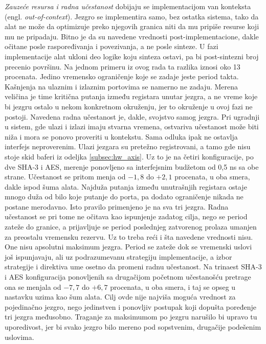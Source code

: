 \textit{Zauzeće resursa i radna učestanost} dobijaju se implementacijom van konteksta (engl. \textit{out-of-context}). Jezgro se implementira samo, bez ostatka sistema, tako da alat ne može da optimizuje preko njegovih granica niti da mu pripiše resurse koji mu ne pripadaju. Bitno je da su navedene vrednosti post-implementacione, dakle očitane posle raspoređivanja i povezivanja, a ne posle sinteze. U fazi implementacije alat ukloni deo logike koju sinteza ostavi, pa bi post-sintezni broj precenio površinu. Na jednom primeru iz ovog rada ta razlika iznosi oko 13 procenata.
\smallbreak
Jedino vremensko ograničenje koje se zadaje jeste period takta. Kašnjenja na ulaznim i izlaznim portovima se namerno ne zadaju. Merena veličina je time kritična putanja između registara unutar jezgra, a ne vreme koje bi jezgru ostalo u nekom konkretnom okruženju, jer to okruženje u ovoj fazi ne postoji. Navedena radna učestanost je, dakle, svojstvo samog jezgra. Pri ugradnji u sistem, gde ulazi i izlazi imaju stvarna vremena, ostvariva učestanost može biti niža i mora se ponovo proveriti u kontekstu. Sama odluka ipak ne ostavlja interfejs neproverenim. Ulazi jezgara su pretežno registrovani, a tamo gde nisu stoje skid baferi iz odeljka \ref{subsec:hw_axis}. Uz to je na četiri konfiguracije, po dve SHA-3 i AES, merenje ponovljeno sa interfejsnim budžetom od 0,5 ns sa obe strane. Učestanost se pritom menja od $-1{,}8$ do $+2{,}1$ procenata, u oba smera, dakle ispod šuma alata. Najduža putanja između unutrašnjih registara ostaje mnogo duža od bilo koje putanje do porta, pa dodato ograničenje nikada ne postane merodavno. Isto pravilo primenjeno je na sva tri jezgra. Radna učestanost se pri tome ne očitava kao ispunjenje zadatog cilja, nego se period zateže do granice, a prijavljuje se period poslednjeg zatvorenog prolaza umanjen za preostalu vremensku rezervu.
\smallbreak
Uz to treba reći i šta navedene vrednosti nisu. One nisu apsolutni maksimum jezgra. Period se zateže dok se vremenski uslovi još ispunjavaju, ali uz podrazumevanu strategiju implementacije, a izbor strategije i direktiva ume osetno da promeni radnu učestanost. Na trinaest SHA-3 i AES konfiguracija ponovljenih sa drugačijom početnom učestanošću pretrage ona se menjala od $-7{,}7$ do $+6{,}7$ procenata, u oba smera, i taj se opseg u nastavku uzima kao šum alata. Cilj ovde nije najviša moguća vrednost za pojedinačno jezgro, nego jedinstven i ponovljiv postupak koji dopušta poređenje tri jezgra međusobno. Traganje za maksimumom po jezgru narušilo bi upravo tu uporedivost, jer bi svako jezgro bilo mereno pod sopstvenim, drugačije podešenim uslovima.

